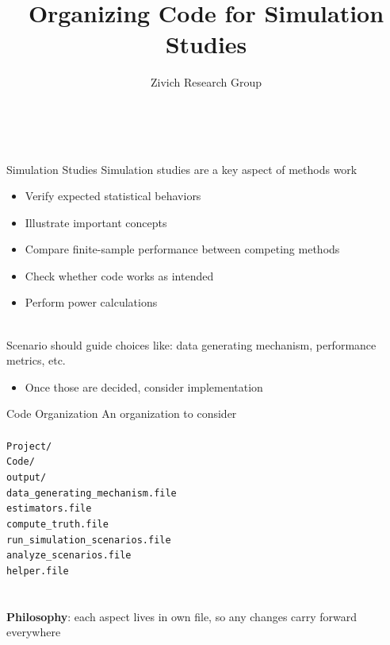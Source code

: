 \documentclass[aspectratio=169]{beamer}
\title[Simulation Code]{Organizing Code for Simulation Studies}
\author[Paul Zivich]{Zivich Research Group}
\date{~}
\begin{document}
\maketitle

\begin{frame}{Simulation Studies}
	Simulation studies are a key aspect of methods work
	\begin{itemize}
		\item Verify expected statistical behaviors
		\item Illustrate important concepts
		\item Compare finite-sample performance between competing methods
		\item Check whether code works as intended
		\item Perform power calculations
	\end{itemize}
	~\\
	Scenario should guide choices like: data generating mechanism, performance metrics, etc.
	\begin{itemize}
		\item Once those are decided, consider implementation
	\end{itemize}
\end{frame}

\begin{frame}{Code Organization}
	An organization to consider
	~\\~\\
	\texttt{\noindent Project/ \\
		\qquad Code/ \\
		\qquad\qquad output/ \\
		\qquad\qquad data\_generating\_mechanism.file \\
		\qquad\qquad estimators.file \\
		\qquad\qquad compute\_truth.file \\
		\qquad\qquad run\_simulation\_scenarios.file \\
		\qquad\qquad analyze\_scenarios.file \\
		\qquad\qquad helper.file \\
	}
	~\\~\\
	\textbf{Philosophy}: each aspect lives in own file, so any changes carry forward everywhere
\end{frame}
\end{document}
